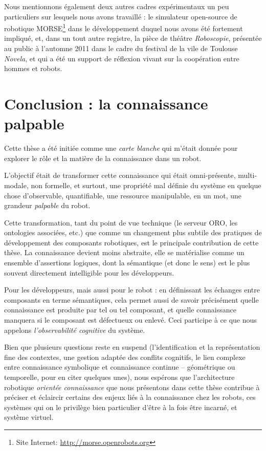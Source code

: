 Nous mentionnons également deux autres cadres expérimentaux un peu particuliers
sur lesquels nous avons travaillé : le simulateur open-source de robotique
MORSE\footnote{Site Internet: \url{http://morse.openrobots.org}} dans le
développement duquel nous avons été fortement impliqué, et, dans un tout autre
registre, la pièce de théâtre \emph{Roboscopie}, présentée au public à
l'automne 2011 dans le cadre du festival de la vile de Toulouse \emph{Novela},
et qui a été un support de réflexion vivant sur la coopération entre hommes et
robots.

\section{Conclusion : la connaissance palpable}

Cette thèse a été initiée comme une \emph{carte blanche} qui m'était donnée pour
explorer le rôle et la matière de la connaissance dans un robot.

L'objectif était de transformer cette connaissance qui était omni-présente,
multi-modale, non formelle, et surtout, une propriété mal définie du système en
quelque chose d'observable, quantifiable, une ressource manipulable, en un mot,
une grandeur \emph{palpable} du robot.

Cette transformation, tant du point de vue technique (le serveur ORO, les
ontologies associées, etc.) que comme un changement plus subtile des pratiques
de développement des composants robotiques, est le principale contribution de
cette thèse. La connaissance devient moins abstraite, elle se matérialise comme
un ensemble d'assertions logiques, dont la sémantique (et donc le sens) est le
plus souvent directement intelligible pour les développeurs.

Pour les développeurs, mais aussi pour le robot : en définissant les échanges
entre composants en terme sémantiques, cela permet aussi de savoir précisément
quelle connaissance est produite par tel ou tel composant, et quelle
connaissance manquera si le composant est défectueux ou enlevé. Ceci participe
à ce que nous appelons \emph{l'observabilité cognitive} du système.

Bien que plusieurs questions reste en suspend (l'identification et la
représentation fine des contextes, une gestion adaptée des conflits cognitifs,
le lien complexe entre connaissance symbolique et connaissance continue --
géométrique ou temporelle, pour en citer quelques unes), nous espérons que
l'architecture robotique \emph{orientée connaissance} que nous présentons dans
cette thèse contribue à préciser et éclaircir certains des enjeux liés à la
connaissance chez les robots, ces systèmes qui on le privilège bien particulier
d'être à la fois être incarné, et système virtuel.



